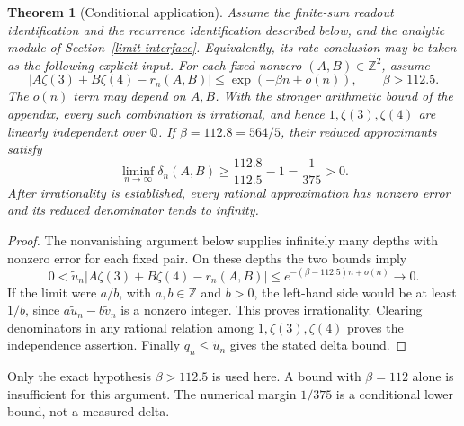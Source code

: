 \documentclass[11pt]{article}
\newcommand{\Z}{\mathbb Z}
\newcommand{\Q}{\mathbb Q}
\newtheorem{theorem}{Theorem}
\begin{document}
\begin{theorem}[Conditional application]\label{conditional-completion}
Assume the finite-sum readout identification and the recurrence
identification described below, and the analytic module of
Section~\ref{limit-interface}. Equivalently, its rate conclusion may
be taken as the following explicit input. For each fixed nonzero
$(A,B)\in\Z^2$, assume
\begin{equation}\label{rate-input}
 |A\zeta(3)+B\zeta(4)-r_n(A,B)|
 \leq\exp(-\beta n+o(n)),\qquad \beta>112.5.
\end{equation}
The $o(n)$ term may depend on $A,B$. With the stronger arithmetic bound
of the appendix, every such combination is irrational, and hence
$1,\zeta(3),\zeta(4)$ are linearly independent over $\Q$.
If $\beta=112.8=564/5$, their reduced approximants satisfy
\[
 \liminf_{n\to\infty}\delta_n(A,B)\geq\frac{112.8}{112.5}-1
 =\frac1{375}>0.
\]
After irrationality is established, every rational approximation has
nonzero error and its reduced denominator tends to infinity.
\end{theorem}
\begin{proof}
The nonvanishing argument below supplies infinitely many depths with
nonzero error for each fixed pair. On these depths the two bounds imply
\[
 0<\widetilde u_n|A\zeta(3)+B\zeta(4)-r_n(A,B)|
 \leq e^{-(\beta-112.5)n+o(n)}\longrightarrow0.
\]
If the limit were $a/b$, with $a,b\in\Z$ and $b>0$, the left-hand
side would be at least $1/b$, since
$a\widetilde u_n-b\widetilde v_n$ is a nonzero integer.
This proves irrationality. Clearing denominators in any rational
relation among $1,\zeta(3),\zeta(4)$ proves the independence assertion.
Finally $q_n\leq\widetilde u_n$ gives the stated delta bound.
\end{proof}
Only the exact hypothesis $\beta>112.5$ is used here. A bound with
$\beta=112$ alone is insufficient for this argument. The numerical
margin $1/375$ is a conditional lower bound, not a measured delta.
\end{document}
